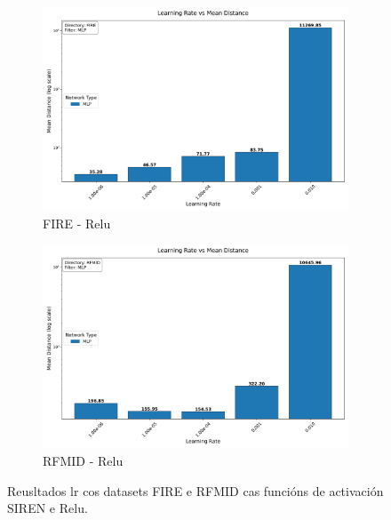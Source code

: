 \begin{figure}[ht]
\begin{subfigure}[b]{0.45\textwidth}
        \includegraphics[width=\textwidth]{imaxes/grid_search_lr_FIRE_MLP.png}
        \caption{FIRE - Relu}
        \label{fig:grid_search_lr_FIRE_MLP}
    \end{subfigure}\hfill
    \begin{subfigure}[b]{0.45\textwidth}
        \includegraphics[width=\textwidth]{imaxes/grid_search_lr_RFMID_MLP.png}
        \caption{RFMID - Relu}
        \label{fig:grid_search_lr_RFMID_MLP}
    \end{subfigure}
    \caption{Reusltados lr cos datasets FIRE e RFMID cas funcións de activación SIREN e Relu.}
    \label{fig:grid_search_lr}
\end{figure}

